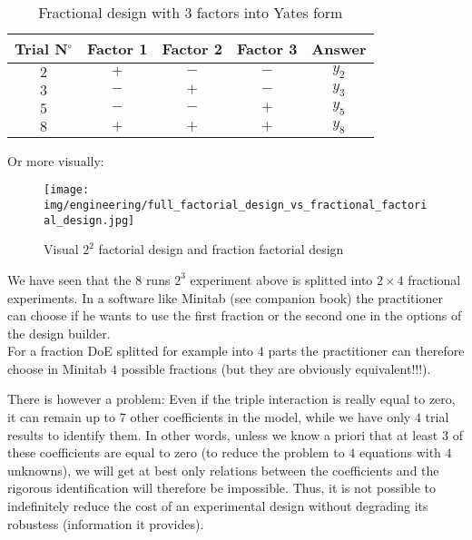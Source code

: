 	\begin{table}[H]\centering
	\begin{center}
			\begin{tabular}{|c|c|c|c|c|}
				\hline
				\multicolumn{1}{c}{\cellcolor{black!30}\textbf{Trial N${}^\circ$}} & 
  \multicolumn{1}{c}{\cellcolor{black!30}\textbf{Factor 1}} & 
  \multicolumn{1}{c}{\cellcolor{black!30}\textbf{Factor 2}} & 
  \multicolumn{1}{c}{\cellcolor{black!30}\textbf{Factor 3}} & 
  \multicolumn{1}{c}{\cellcolor{black!30}\textbf{Answer}} \\ \hline
				 $2$ & $+$ & $-$ & $-$ & $y_2$\\ \hline
				 $3$ & $-$ & $+$ & $-$ & $y_3$\\ \hline
				 $5$ & $-$ & $-$ & $+$ & $y_5$\\ \hline
				 $8$ & $+$ & $+$ & $+$ & $y_8$\\ \hline
 		\end{tabular}
	\end{center}
	\caption{Fractional design with 3 factors into Yates form}
	\end{table}
	Or more visually:
	\begin{figure}[H]
		\begin{center}
		\texttt{[image: img/engineering/full\_factorial\_design\_vs\_fractional\_factorial\_design.jpg]}
		\end{center}	
		\caption{Visual $2^2$ factorial design and fraction factorial design}
	\end{figure}
	\begin{tcolorbox}[title=Remark,colframe=black,arc=10pt]
	We have seen that the $8$ runs $2^3$ experiment above is splitted into $2\times 4$ fractional experiments. In a software like Minitab (see companion book) the practitioner can choose if he wants to use the first fraction or the second one in the options of the design builder.\\ 
	
	For a fraction DoE splitted for example into $4$ parts the practitioner can therefore choose in Minitab $4$ possible fractions (but they are obviously equivalent!!!).
	\end{tcolorbox}
	There is however a problem: Even if the triple interaction is really equal to zero, it can remain up to $7$ other coefficients in the model, while we have only $4$ trial results to identify them. In other words, unless we know a priori that at least $3$ of these coefficients are equal to zero (to reduce the problem to $4$ equations with $4$ unknowns), we will get at best only relations between the coefficients and the rigorous identification will therefore be impossible. Thus, it is not possible to indefinitely reduce the cost of an experimental design without degrading its robustess (information it provides).
	

